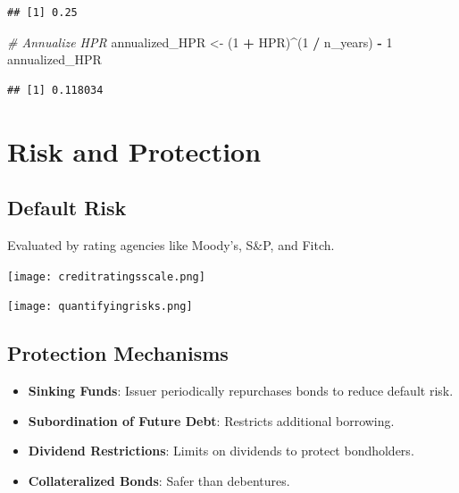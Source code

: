 \documentclass[
]{book}
\newenvironment{Shaded}{\begin{snugshade}}{\end{snugshade}}
\newcommand{\CommentTok}[1]{\textcolor[rgb]{0.56,0.35,0.01}{\textit{#1}}}
\newcommand{\DecValTok}[1]{\textcolor[rgb]{0.00,0.00,0.81}{#1}}
\newcommand{\NormalTok}[1]{#1}
\newcommand{\OtherTok}[1]{\textcolor[rgb]{0.56,0.35,0.01}{#1}}
\newcommand{\SpecialCharTok}[1]{\textcolor[rgb]{0.81,0.36,0.00}{\textbf{#1}}}
\providecommand{\tightlist}{%
  \setlength{\itemsep}{0pt}\setlength{\parskip}{0pt}}
\begin{document}
\begin{verbatim}
## [1] 0.25
\end{verbatim}

\begin{Shaded}
\begin{Highlighting}[]
\CommentTok{\# Annualize HPR}
\NormalTok{annualized\_HPR }\OtherTok{\textless{}{-}}\NormalTok{ (}\DecValTok{1} \SpecialCharTok{+}\NormalTok{ HPR)}\SpecialCharTok{\^{}}\NormalTok{(}\DecValTok{1} \SpecialCharTok{/}\NormalTok{ n\_years) }\SpecialCharTok{{-}} \DecValTok{1}
\NormalTok{annualized\_HPR}
\end{Highlighting}
\end{Shaded}

\begin{verbatim}
## [1] 0.118034
\end{verbatim}

\hypertarget{risk-and-protection}{%
\section{Risk and Protection}\label{risk-and-protection}}

\hypertarget{default-risk}{%
\subsection{Default Risk}\label{default-risk}}

Evaluated by rating agencies like Moody's, S\&P, and Fitch.

\texttt{[image: creditratingsscale.png]}

\texttt{[image: quantifyingrisks.png]}

\hypertarget{protection-mechanisms}{%
\subsection{Protection Mechanisms}\label{protection-mechanisms}}

\begin{itemize}
\tightlist
\item
  \textbf{Sinking Funds}: Issuer periodically repurchases bonds to
  reduce default risk.
\item
  \textbf{Subordination of Future Debt}: Restricts additional borrowing.
\item
  \textbf{Dividend Restrictions}: Limits on dividends to protect
  bondholders.
\item
  \textbf{Collateralized Bonds}: Safer than debentures.
\end{itemize}
\end{document}
